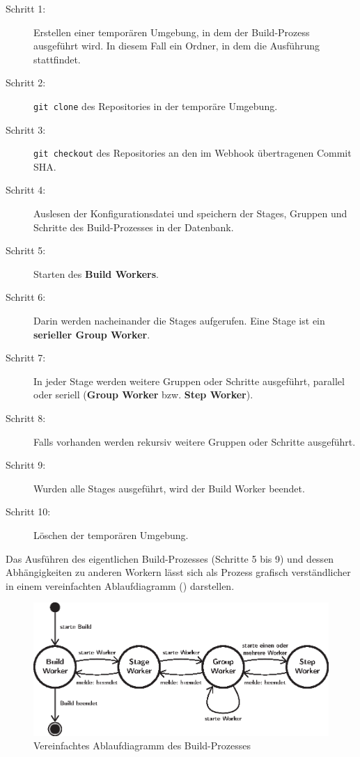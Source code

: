 \begin{description}
  \item[Schritt 1:] Erstellen einer temporären Umgebung, in dem der Build-Prozess ausgeführt wird. In diesem Fall ein Ordner, in dem die Ausführung stattfindet.
  \item[Schritt 2:] \texttt{git clone} des Repositories in der temporäre Umgebung.
  \item[Schritt 3:] \texttt{git checkout} des Repositories an den im Webhook übertragenen Commit SHA.
  \item[Schritt 4:] Auslesen der Konfigurationsdatei und speichern der Stages, Gruppen und Schritte des Build-Prozesses in der Datenbank.
  \item[Schritt 5:] Starten des \textbf{Build Workers}.
  \item[Schritt 6:] Darin werden nacheinander die Stages aufgerufen. Eine Stage ist ein \textbf{serieller Group Worker}.
  \item[Schritt 7:] In jeder Stage werden weitere Gruppen oder Schritte ausgeführt, parallel oder seriell (\textbf{Group Worker} bzw. \textbf{Step Worker}).
  \item[Schritt 8:] Falls vorhanden werden rekursiv weitere Gruppen oder Schritte ausgeführt.
  \item[Schritt 9:] Wurden alle Stages ausgeführt, wird der Build Worker beendet.
  \item[Schritt 10:] Löschen der temporären Umgebung.
\end{description}

Das Ausführen des eigentlichen Build-Prozesses (Schritte 5 bis 9) und dessen Abhängigkeiten zu anderen Workern lässt sich als Prozess grafisch verständlicher in einem vereinfachten Ablaufdiagramm () darstellen.

\begin{figure}[h]
  \caption{Vereinfachtes Ablaufdiagramm des Build-Prozesses}
  \label{fig:ablauf-build-prozess}
  \centering
    \includegraphics[width=\textwidth]{assets/worker_diagram}
\end{figure}

